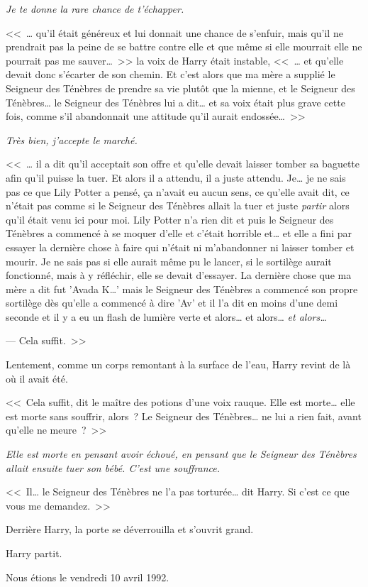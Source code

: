 \emph{Je te donne la rare chance de t'échapper.}

<<~… qu'il était généreux et lui donnait une chance de s'enfuir, mais qu'il ne prendrait pas la peine de se battre contre elle et que même si elle mourrait elle ne pourrait pas me sauver…~>> la voix de Harry était instable, <<~… et qu'elle devait donc s'écarter de son chemin. Et c'est alors que ma mère a supplié le Seigneur des Ténèbres de prendre sa vie plutôt que la mienne, et le Seigneur des Ténèbres… le Seigneur des Ténèbres lui a dit… et sa voix était plus grave cette fois, comme s'il abandonnait une attitude qu'il aurait endossée…~>>

\emph{Très bien, j'accepte le marché.}

<<~… il a dit qu'il acceptait son offre et qu'elle devait laisser tomber sa baguette afin qu'il puisse la tuer. Et alors il a attendu, il a juste attendu. Je… je ne sais pas ce que Lily Potter a pensé, ça n'avait eu aucun sens, ce qu'elle avait dit, ce n'était pas comme si le Seigneur des Ténèbres allait la tuer et juste \emph{partir} alors qu'il était venu ici pour moi. Lily Potter n'a rien dit et puis le Seigneur des Ténèbres a commencé à se moquer d'elle et c'était horrible et… et elle a fini par essayer la dernière chose à faire qui n'était ni m'abandonner ni laisser tomber et mourir. Je ne sais pas si elle aurait même pu le lancer, si le sortilège aurait fonctionné, mais à y réfléchir, elle se devait d'essayer. La dernière chose que ma mère a dit fut 'Avada K…' mais le Seigneur des Ténèbres a commencé son propre sortilège dès qu'elle a commencé à dire 'Av' et il l'a dit en moins d'une demi seconde et il y a eu un flash de lumière verte et alors… et alors… \emph{et alors…}

--- Cela suffit.~>>

Lentement, comme un corps remontant à la surface de l'eau, Harry revint de là où il avait été.

<<~Cela suffit, dit le maître des potions d'une voix rauque. Elle est morte… elle est morte sans souffrir, alors~? Le Seigneur des Ténèbres… ne lui a rien fait, avant qu'elle ne meure~?~>>

\emph{Elle est morte en pensant avoir échoué, en pensant que le Seigneur des Ténèbres allait ensuite tuer son bébé. C'est une souffrance.}

<<~Il… le Seigneur des Ténèbres ne l'a pas torturée… dit Harry. Si c'est ce que vous me demandez.~>>

Derrière Harry, la porte se déverrouilla et s'ouvrit grand.

Harry partit.

Nous étions le vendredi 10 avril 1992.
